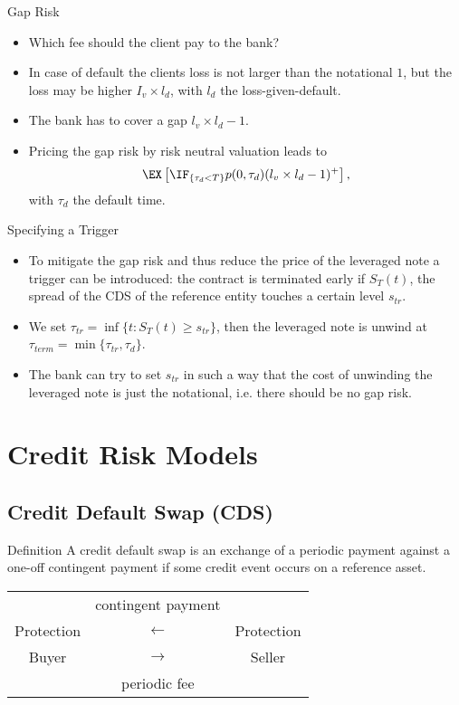 {Gap Risk}
\begin{itemize}
\item<1-> Which fee should the client pay to the bank?
\item<2-> In case of default the clients loss is not larger than the notational $1$, but the loss may be higher $I_v \times l_d$, with $l_d$ the loss-given-default.
\item<3-> The bank has to cover a gap $l_v \times l_d -1$.
\item<4-> Pricing the gap risk by risk neutral valuation leads to
$$
\EX\left[\IF_{\{\tau_d < T\}} p(0,\tau_d)(l_v \times l_d -1)^+\right],
$$
with $\tau_d$ the default time.

\end{itemize}





{Specifying a Trigger}
\begin{itemize}
\item<1-> To mitigate the gap risk and thus reduce the price of the leveraged note a trigger can be introduced: the contract is terminated early if $S_T(t)$, the spread of the CDS of the reference entity touches a certain level  $s_{tr}$.
\item<2-> We set $\tau_{tr}= \inf\{t: S_T(t) \geq s_{tr}\}$, then the leveraged note is unwind at $\tau_{term}= \min\{\tau_{tr}, \tau_{d} \}$.
\item<3-> The bank can try to set $s_{tr}$ in such a way that the cost of unwinding the leveraged note is just the notational, i.e. there should be no gap risk.
\end{itemize}





\section{Credit Risk Models}
\subsection{Credit Default Swap (CDS)}

{Definition}
A credit default swap is an exchange of a periodic payment against
a one-off contingent payment if some credit event occurs on a
reference asset.

\begin{table}[htb]
\begin{center}
\begin{tabular}{ccc}
& {\small contingent payment} & \\
Protection& $\longleftarrow $ & Protection\\
Buyer & $\longrightarrow $& Seller\\
& {\small periodic fee} &
\end{tabular}
\end{center}
\end{table}



